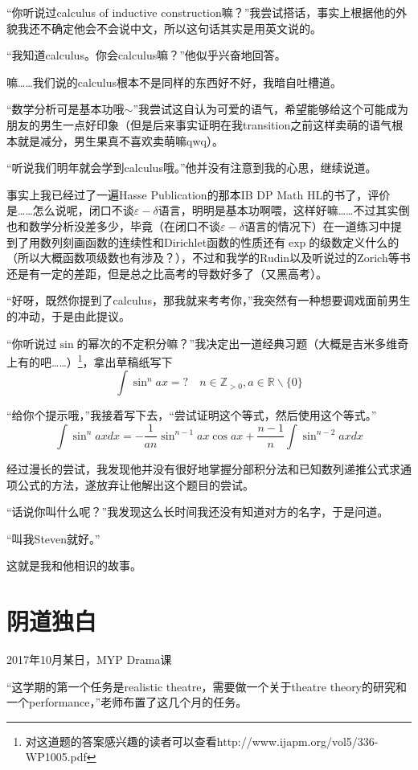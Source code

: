 \documentclass{article}
\begin{document}
“你听说过calculus of inductive construction嘛？”我尝试搭话，事实上根据他的外貌我还不确定他会不会说中文，所以这句话其实是用英文说的。

“我知道calculus。你会calculus嘛？”他似乎兴奋地回答。

嘛……我们说的calculus根本不是同样的东西好不好，我暗自吐槽道。

“数学分析可是基本功哦$\sim$”我尝试这自认为可爱的语气，希望能够给这个可能成为朋友的男生一点好印象（但是后来事实证明在我transition之前这样卖萌的语气根本就是减分，男生果真不喜欢卖萌嘛qwq）。

“听说我们明年就会学到calculus哦。”他并没有注意到我的心思，继续说道。

事实上我已经过了一遍Hasse Publication的那本IB DP Math HL的书了，评价是……怎么说呢，闭口不谈$\varepsilon-\delta$语言，明明是基本功啊喂，这样好嘛……不过其实倒也和数学分析没差多少，毕竟（在闭口不谈$\varepsilon-\delta$语言的情况下）在一道练习中提到了用数列刻画函数的连续性和Dirichlet函数的性质还有$\exp$的级数定义什么的（所以大概函数项级数也有涉及？），不过和我学的Rudin以及听说过的Zorich等书还是有一定的差距，但是总之比高考的导数好多了（又黑高考）。

“好呀，既然你提到了calculus，那我就来考考你，”我突然有一种想要调戏面前男生的冲动，于是由此提议。

“你听说过$\sin$的幂次的不定积分嘛？”我决定出一道经典习题（大概是吉米多维奇上有的吧……）\footnote{对这道题的答案感兴趣的读者可以查看http://www.ijapm.org/vol5/336-WP1005.pdf}，拿出草稿纸写下
$$
\int\sin^nax=?\quad n\in\mathbb{Z}_{>0},a\in\mathbb{R}\mathbin{\backslash}\{0\}
$$

“给你个提示哦，”我接着写下去，“尝试证明这个等式，然后使用这个等式。”
$$
\int \sin ^{n} a x d x=-\frac{1}{an} \sin ^{n-1} a x \cos a x+\frac{n-1}{n} \int \sin ^{n-2} a x d x
$$

经过漫长的尝试，我发现他并没有很好地掌握分部积分法和已知数列递推公式求通项公式的方法，遂放弃让他解出这个题目的尝试。

“话说你叫什么呢？”我发现这么长时间我还没有知道对方的名字，于是问道。

“叫我Steven就好。”

这就是我和他相识的故事。

\section{阴道独白}
2017年10月某日，MYP Drama课

“这学期的第一个任务是realistic theatre，需要做一个关于theatre theory的研究和一个performance，”老师布置了这几个月的任务。
\end{document}
